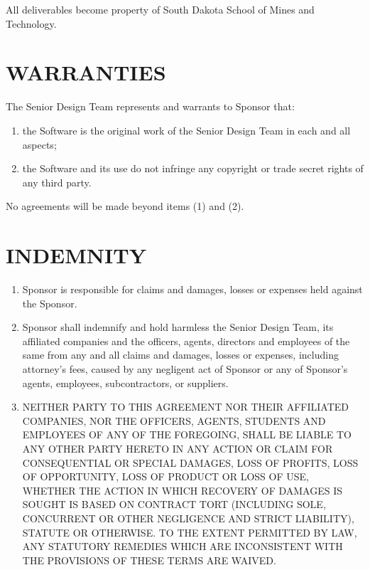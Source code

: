 \documentclass[11pt]{article}
\begin{document}
All deliverables become property of South Dakota School of Mines and Technology.

\section{WARRANTIES }  

The Senior Design Team represents and warrants to Sponsor that:         
\begin{enumerate}  \itemsep4pt \parskip0pt 
\item  the Software is the original work of the Senior Design Team in each and all aspects;        

\item the Software and its use do not infringe any copyright or   trade secret rights of any third party.  
\end{enumerate}
No agreements will be made beyond items (1) and (2).

\section{INDEMNITY}   
\begin{enumerate}  \itemsep4pt \parskip0pt 
\item Sponsor is responsible for claims and damages, losses or expenses held against the Sponsor. 

\item  Sponsor shall       indemnify and hold harmless the Senior Design Team, its affiliated companies       and the officers, agents, directors and employees of the same from       any and all claims and damages, losses or expenses, including       attorney's fees, caused by any negligent act of Sponsor or any of       Sponsor's agents, employees, subcontractors, or suppliers.    

\item  NEITHER PARTY TO THIS AGREEMENT NOR THEIR AFFILIATED COMPANIES,       NOR THE OFFICERS, AGENTS, STUDENTS AND EMPLOYEES OF ANY OF THE       FOREGOING, SHALL BE LIABLE TO ANY OTHER PARTY HERETO IN ANY ACTION       OR CLAIM FOR CONSEQUENTIAL OR SPECIAL DAMAGES, LOSS OF PROFITS,       LOSS OF OPPORTUNITY, LOSS OF PRODUCT OR LOSS OF USE, WHETHER THE       ACTION IN WHICH RECOVERY OF DAMAGES IS SOUGHT IS BASED ON CONTRACT       TORT (INCLUDING SOLE, CONCURRENT OR OTHER NEGLIGENCE AND STRICT       LIABILITY), STATUTE OR OTHERWISE. TO THE EXTENT PERMITTED BY LAW,       ANY STATUTORY REMEDIES WHICH ARE INCONSISTENT WITH THE PROVISIONS       OF THESE TERMS ARE WAIVED.  
\end{enumerate}
\end{document}

